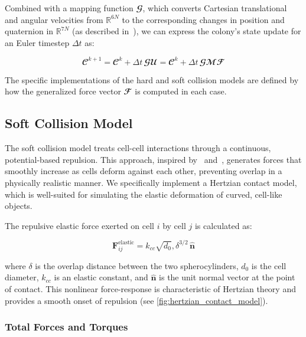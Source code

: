 \documentclass[conference]{IEEEtran}
\begin{document}
Combined with a mapping function $\mathbfcal{G}$, which converts Cartesian translational and angular velocities from $\mathbb{R}^{6N}$ to the corresponding changes in position and quaternion in $\mathbb{R}^{7N}$ (as described in~\cite{Weady2024}), we can express the colony's state update for an Euler timestep $\Delta t$ as:

\begin{equation} \label{eq:colony_update}
    \mathbfcal{C}^{k+1} = \mathbfcal{C}^k + \Delta t \, \mathbfcal{G} \mathbfcal{U} = \mathbfcal{C}^k + \Delta t \, \mathbfcal{G} \mathbfcal{M} \mathbfcal{F}
\end{equation}


The specific implementations of the hard and soft collision models are defined by how the generalized force vector $\mathbfcal{F}$ is computed in each case.

\newpage

\subsection{Soft Collision Model}

The soft collision model treats cell-cell interactions through a continuous, potential-based repulsion. This approach, inspired by~\cite{Warren2019} and~\cite{You2018}, generates forces that smoothly increase as cells deform against each other, preventing overlap in a physically realistic manner. We specifically implement a Hertzian contact model, which is well-suited for simulating the elastic deformation of curved, cell-like objects.

The repulsive elastic force exerted on cell $i$ by cell $j$ is calculated as:

\begin{equation} \label{eq:hertzian_contact_model}
    \mathbf{F}^{\text{elastic}}_{ij} = k_{cc} \sqrt{d_0} , \delta^{3/2} \, \hat{\mathbf{n}}
\end{equation}

where $\delta$ is the overlap distance between the two spherocylinders, $d_0$ is the cell diameter, $k_{cc}$ is an elastic constant, and $\hat{\mathbf{n}}$ is the unit normal vector at the point of contact. This nonlinear force-response is characteristic of Hertzian theory and provides a smooth onset of repulsion (see \autoref{fig:hertzian_contact_model}).

\subsubsection{Total Forces and Torques}
\end{document}
